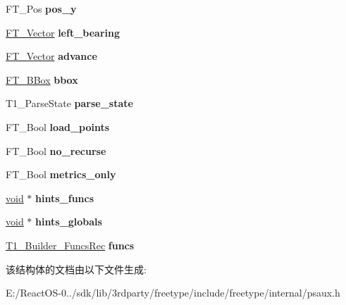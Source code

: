 \begin{DoxyCompactItemize}
F\+T\+\_\+\+Pos {\bfseries pos\+\_\+y}
\item 
\mbox{\label{struct_t1___builder_rec___a86247b8fd87873ef93aecf0e27e4b6dc}} 
\hyperlink{struct_f_t___vector__}{F\+T\+\_\+\+Vector} {\bfseries left\+\_\+bearing}
\item 
\mbox{\label{struct_t1___builder_rec___a48575715ea96f16bdc7077996013ef9e}} 
\hyperlink{struct_f_t___vector__}{F\+T\+\_\+\+Vector} {\bfseries advance}
\item 
\mbox{\label{struct_t1___builder_rec___a534c6d954f8cf791a94489350314a8f7}} 
\hyperlink{struct_f_t___b_box__}{F\+T\+\_\+\+B\+Box} {\bfseries bbox}
\item 
\mbox{\label{struct_t1___builder_rec___afaa675cc3601ed05ed86bc474153094b}} 
T1\+\_\+\+Parse\+State {\bfseries parse\+\_\+state}
\item 
\mbox{\label{struct_t1___builder_rec___acaf59a770471bf90b5b7d9f72e97e64e}} 
F\+T\+\_\+\+Bool {\bfseries load\+\_\+points}
\item 
\mbox{\label{struct_t1___builder_rec___a0369f22bec404666e1c7dc6bb648ac28}} 
F\+T\+\_\+\+Bool {\bfseries no\+\_\+recurse}
\item 
\mbox{\label{struct_t1___builder_rec___ab4c509b363e5a5f4da25460413e9364f}} 
F\+T\+\_\+\+Bool {\bfseries metrics\+\_\+only}
\item 
\mbox{\label{struct_t1___builder_rec___aeed4b5ebe5256cc07e31159b4a4a95ff}} 
\hyperlink{interfacevoid}{void} $\ast$ {\bfseries hints\+\_\+funcs}
\item 
\mbox{\label{struct_t1___builder_rec___ae94605dc79c1d54c1b59423046b38671}} 
\hyperlink{interfacevoid}{void} $\ast$ {\bfseries hints\+\_\+globals}
\item 
\mbox{\label{struct_t1___builder_rec___acecf3c6c134bccd36a1d30e10147ca54}} 
\hyperlink{struct_t1___builder___funcs_rec__}{T1\+\_\+\+Builder\+\_\+\+Funcs\+Rec} {\bfseries funcs}
\end{DoxyCompactItemize}


该结构体的文档由以下文件生成\+:\begin{DoxyCompactItemize}
\item 
E\+:/\+React\+O\+S-\/0../sdk/lib/3rdparty/freetype/include/freetype/internal/psaux.\+h\end{DoxyCompactItemize}
